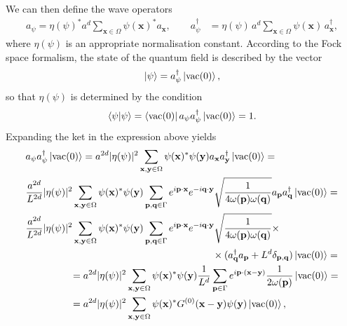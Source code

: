 \documentclass[a4paper,10pt]{report}
\begin{document}
We can then define the wave operators
\begin{align}
a_\psi = \eta(\psi)^*a^d\sum_{\mathbf{x}\in\Omega}\psi(\mathbf{x})^*a_\mathbf{x}, \qquad a^\dag_\psi &= \eta(\psi)\,a^d\sum_{\mathbf{x}\in\Omega}\psi(\mathbf{x})\,a^\dag_\mathbf{x},
\end{align}
where $\eta(\psi)$ is an appropriate normalisation constant. According to the Fock space formalism, the state of the quantum field is described by the vector
\begin{equation}
\ket{\psi} = a^\dag_\psi\ket{\mathrm{vac}(0)},
\end{equation}
so that $\eta(\psi)$ is determined by the condition 
\begin{equation}
\langle\psi|\psi\rangle = \bra{\mathrm{vac}(0)}a_\psi a^\dag_\psi\ket{\mathrm{vac}(0)} = 1.
\end{equation}
Expanding the ket in the expression above yields
\begin{align}
&a_\psi a^\dag_\psi\ket{\mathrm{vac}(0)} = a^{2d}|\eta(\psi)|^2\sum_{\mathbf{x},\mathbf{y}\in\Omega}\psi(\mathbf{x})^*\psi(\mathbf{y})a_\mathbf{x}a^\dag_\mathbf{y}\ket{\mathrm{vac}(0)} = \nonumber\\
&\frac{a^{2d}}{L^{2d}}|\eta(\psi)|^2\sum_{\mathbf{x},\mathbf{y}\in\Omega}\psi(\mathbf{x})^*\psi(\mathbf{y})\sum_{\mathbf{p},\mathbf{q}\in\Gamma}e^{i\mathbf{p}\cdot\mathbf{x}}e^{-i\mathbf{q}\cdot\mathbf{y}}\sqrt{\frac{1}{4\omega(\mathbf{p})\omega(\mathbf{q})}}a_\mathbf{p}a^\dag_\mathbf{q}\ket{\mathrm{vac}(0)} = \nonumber\\
&\frac{a^{2d}}{L^{2d}}|\eta(\psi)|^2\sum_{\mathbf{x},\mathbf{y}\in\Omega}\psi(\mathbf{x})^*\psi(\mathbf{y})\sum_{\mathbf{p},\mathbf{q}\in\Gamma}e^{i\mathbf{p}\cdot\mathbf{x}}e^{-i\mathbf{q}\cdot\mathbf{y}}\sqrt{\frac{1}{4\omega(\mathbf{p})\omega(\mathbf{q})}}\times \nonumber\\
&\hspace{6.7cm}\times (a^\dag_\mathbf{q}a_\mathbf{p}+L^d\delta_{\mathbf{p},\mathbf{q}})\ket{\mathrm{vac}(0)} = \nonumber\\
&\hspace{1.6cm}= a^{2d}|\eta(\psi)|^2\sum_{\mathbf{x},\mathbf{y}\in\Omega}\psi(\mathbf{x})^*\psi(\mathbf{y})\frac{1}{L^d}\sum_{\mathbf{p}\in\Gamma}e^{i\mathbf{p}\cdot(\mathbf{x}-\mathbf{y})}\frac{1}{2\omega(\mathbf{p})}\ket{\mathrm{vac}(0)} = \nonumber\\
&\hspace{1.6cm}= a^{2d}|\eta(\psi)|^2\sum_{\mathbf{x},\mathbf{y}\in\Omega}\psi(\mathbf{x})^*G^{(0)}(\mathbf{x}-\mathbf{y})\psi(\mathbf{y})\ket{\mathrm{vac}(0)},
\end{align}
\end{document}
